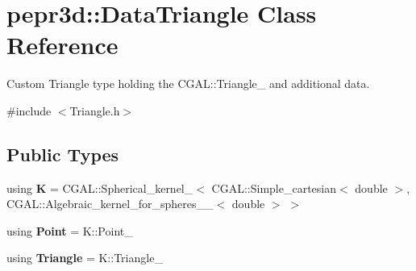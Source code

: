 \hypertarget{classpepr3d_1_1_data_triangle}{}\section{pepr3d\+::Data\+Triangle Class Reference}
\label{classpepr3d_1_1_data_triangle}


Custom Triangle type holding the C\+G\+A\+L\+::\+Triangle\+\_ and additional data.  




{\ttfamily \#include $<$Triangle.\+h$>$}

\subsection*{Public Types}
\begin{DoxyCompactItemize}
\item 
\mbox{\label{classpepr3d_1_1_data_triangle_adf8c461f0a38c6878bf33fd634bb664a}} 
using {\bfseries K} = C\+G\+A\+L\+::\+Spherical\+\_\+kernel\+\_$<$ C\+G\+A\+L\+::\+Simple\+\_\+cartesian$<$ double $>$, C\+G\+A\+L\+::\+Algebraic\+\_\+kernel\+\_\+for\+\_\+spheres\+\_\+\_$<$ double $>$ $>$
\item 
\mbox{\label{classpepr3d_1_1_data_triangle_ac03486dce366d46510967588934ac54e}} 
using {\bfseries Point} = K\+::\+Point\+\_
\item 
\mbox{\label{classpepr3d_1_1_data_triangle_afd5820980632751ddbf6b3533546e9dd}} 
using {\bfseries Triangle} = K\+::\+Triangle\+\_
\end{DoxyCompactItemize}

